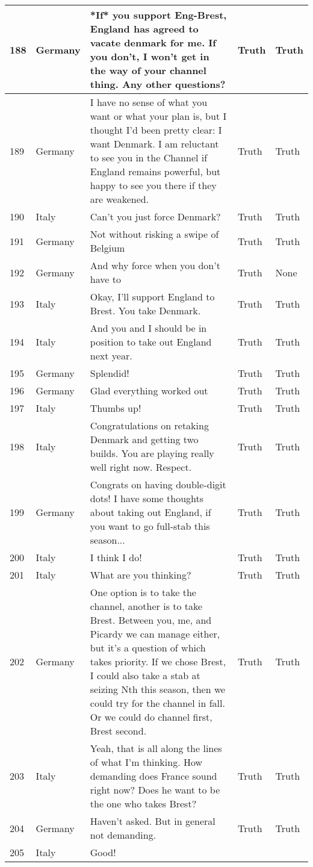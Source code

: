 \begin{longtable}{p{.3 cm} p{1.25cm} p{8.25cm} p{1.1cm} p{1.1cm}}
		\hline
		188 & Germany & *If* you support Eng-Brest, England has agreed to vacate denmark for me. If you don't, I won't get in the way of your channel thing. Any other questions? & Truth & Truth \\
		\hline
		189 & Germany & I have no sense of what you want or what your plan is, but I thought I'd been pretty clear: I want Denmark. I am reluctant to see you in the Channel if England remains powerful, but happy to see you there if they are weakened. & Truth & Truth \\
		\hline
		190 & Italy & Can't you just force Denmark? & Truth & Truth \\
		\hline
		191 & Germany & Not without risking a swipe of Belgium & Truth & Truth \\
		\hline
		192 & Germany & And why force when you don't have to & Truth & None \\
		\hline
		193 & Italy & Okay, I'll support England to Brest. You take Denmark. & Truth & Truth \\
		\hline
		194 & Italy & And you and I should be in position to take out England next year. & Truth & Truth \\
		\hline
		195 & Germany & Splendid! & Truth & Truth \\
		\hline
		196 & Germany & Glad everything worked out & Truth & Truth \\
		\hline
		197 & Italy & Thumbs up! & Truth & Truth \\
		\hline
		198 & Italy & Congratulations on retaking Denmark and getting two builds. You are playing really well right now. Respect. & Truth & Truth \\
		\hline
		199 & Germany & Congrats on having double-digit dots! I have some thoughts about taking out England, if you want to go full-stab this season... & Truth & Truth \\
		\hline
		200 & Italy & I think I do! & Truth & Truth \\
		\hline
		201 & Italy & What are you thinking? & Truth & Truth \\
		\hline
		202 & Germany & One option is to take the channel, another is to take Brest. Between you, me, and Picardy we can manage either, but it's a question of which takes priority. If we chose Brest, I could also take a stab at seizing Nth this season, then we could try for the channel in fall. Or we could do channel first, Brest second. & Truth & Truth \\
		\hline
		203 & Italy & Yeah, that is all along the lines of what I'm thinking. How demanding does France sound right now? Does he want to be the one who takes Brest? & Truth & Truth \\
		\hline
		204 & Germany & Haven't asked. But in general not demanding. & Truth & Truth \\
		\hline
		205 & Italy & Good!
		

\end{longtable}
